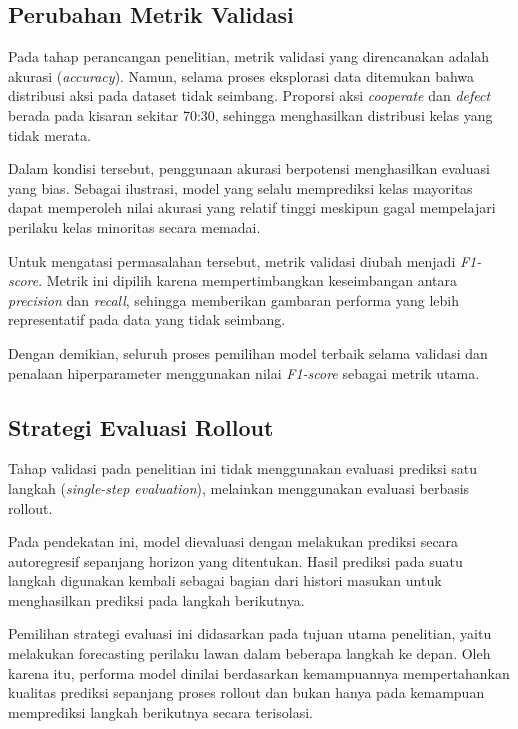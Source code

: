 \subsection{Perubahan Metrik Validasi}

Pada tahap perancangan penelitian, metrik validasi yang direncanakan adalah akurasi (\textit{accuracy}). Namun, selama proses eksplorasi data ditemukan bahwa distribusi aksi pada dataset tidak seimbang. Proporsi aksi \textit{cooperate} dan \textit{defect} berada pada kisaran sekitar 70:30, sehingga menghasilkan distribusi kelas yang tidak merata.

Dalam kondisi tersebut, penggunaan akurasi berpotensi menghasilkan evaluasi yang bias. Sebagai ilustrasi, model yang selalu memprediksi kelas mayoritas dapat memperoleh nilai akurasi yang relatif tinggi meskipun gagal mempelajari perilaku kelas minoritas secara memadai.

Untuk mengatasi permasalahan tersebut, metrik validasi diubah menjadi \textit{F1-score}. Metrik ini dipilih karena mempertimbangkan keseimbangan antara \textit{precision} dan \textit{recall}, sehingga memberikan gambaran performa yang lebih representatif pada data yang tidak seimbang.

Dengan demikian, seluruh proses pemilihan model terbaik selama validasi dan penalaan hiperparameter menggunakan nilai \textit{F1-score} sebagai metrik utama.

\subsection{Strategi Evaluasi Rollout}

Tahap validasi pada penelitian ini tidak menggunakan evaluasi prediksi satu langkah (\textit{single-step evaluation}), melainkan menggunakan evaluasi berbasis rollout.

Pada pendekatan ini, model dievaluasi dengan melakukan prediksi secara autoregresif sepanjang horizon yang ditentukan. Hasil prediksi pada suatu langkah digunakan kembali sebagai bagian dari histori masukan untuk menghasilkan prediksi pada langkah berikutnya.

Pemilihan strategi evaluasi ini didasarkan pada tujuan utama penelitian, yaitu melakukan forecasting perilaku lawan dalam beberapa langkah ke depan. Oleh karena itu, performa model dinilai berdasarkan kemampuannya mempertahankan kualitas prediksi sepanjang proses rollout dan bukan hanya pada kemampuan memprediksi langkah berikutnya secara terisolasi.

